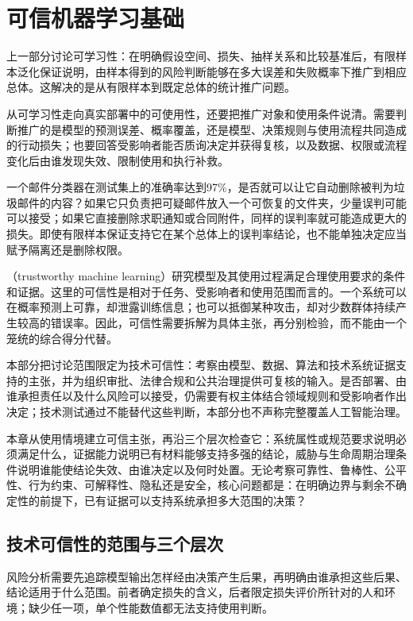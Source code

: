 \chapter{可信机器学习基础}
\label{chap:trust-foundations}

上一部分讨论可学习性：在明确假设空间、损失、抽样关系和比较基准后，有限样本泛化保证说明，由样本得到的风险判断能够在多大误差和失败概率下推广到相应总体。这解决的是从有限样本到既定总体的统计推广问题。

从可学习性走向真实部署中的可使用性，还要把推广对象和使用条件说清。需要判断推广的是模型的预测误差、概率覆盖，还是模型、决策规则与使用流程共同造成的行动损失；也要回答受影响者能否质询决定并获得复核，以及数据、权限或流程变化后由谁发现失效、限制使用和执行补救。

一个邮件分类器在测试集上的准确率达到97\%，是否就可以让它自动删除被判为垃圾邮件的内容？如果它只负责把可疑邮件放入一个可恢复的文件夹，少量误判可能可以接受；如果它直接删除求职通知或合同附件，同样的误判率就可能造成更大的损失。即使有限样本保证支持它在某个总体上的误判率结论，也不能单独决定应当赋予隔离还是删除权限。

（trustworthy machine learning）研究模型及其使用过程满足合理使用要求的条件和证据。这里的可信性是相对于任务、受影响者和使用范围而言的。一个系统可以在概率预测上可靠，却泄露训练信息；也可以抵御某种攻击，却对少数群体持续产生较高的错误率。因此，可信性需要拆解为具体主张，再分别检验，而不能由一个笼统的综合得分代替。

本部分把讨论范围限定为技术可信性：考察由模型、数据、算法和技术系统证据支持的主张，并为组织审批、法律合规和公共治理提供可复核的输入。是否部署、由谁承担责任以及什么风险可以接受，仍需要有权主体结合领域规则和受影响者作出决定；技术测试通过不能替代这些判断，本部分也不声称完整覆盖人工智能治理。

本章从使用情境建立可信主张，再沿三个层次检查它：系统属性或规范要求说明必须满足什么，证据能力说明已有材料能够支持多强的结论，威胁与生命周期治理条件说明谁能使结论失效、由谁决定以及何时处置。无论考察可靠性、鲁棒性、公平性、行为约束、可解释性、隐私还是安全，核心问题都是：在明确边界与剩余不确定性的前提下，已有证据可以支持系统承担多大范围的决策？

\section{技术可信性的范围与三个层次}
\label{sec:trust-context}

风险分析需要先追踪模型输出怎样经由决策产生后果，再明确由谁承担这些后果、结论适用于什么范围。前者确定损失的含义，后者限定损失评价所针对的人和环境；缺少任一项，单个性能数值都无法支持使用判断。

